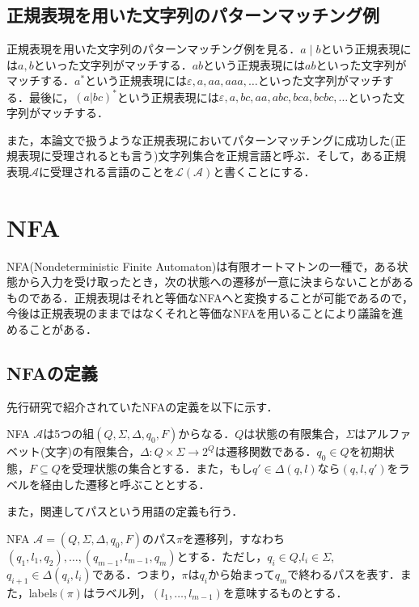 \documentclass[a4paper, 12pt, dvipdfmx, uplatex]{jsreport}
\begin{document}
\subsection{正規表現を用いた文字列のパターンマッチング例}
正規表現を用いた文字列のパターンマッチング例を見る．$a\mid b$という正規表現には$a,b$といった文字列がマッチする．$ab$という正規表現には$ab$といった文字列がマッチする．$a^*$という正規表現には$\varepsilon,a,aa,aaa,\ldots$といった文字列がマッチする．最後に，$(a|bc)^*$という正規表現には$\varepsilon,a,bc,aa,abc,bca,bcbc,\ldots$といった文字列がマッチする．

また，本論文で扱うような正規表現においてパターンマッチングに成功した(正規表現に受理されるとも言う)文字列集合を正規言語と呼ぶ．そして，ある正規表現$\mathcal{A}$に受理される言語のことを$\mathcal{L(A)}$と書くことにする．


\section{NFA}
NFA(Nondeterministic Finite Automaton)は有限オートマトンの一種で，ある状態から入力を受け取ったとき，次の状態への遷移が一意に決まらないことがあるものである．正規表現はそれと等価なNFAへと変換することが可能であるので，今後は正規表現のままではなくそれと等価なNFAを用いることにより議論を進めることがある．

\subsection{NFAの定義}
先行研究で紹介されていたNFAの定義を以下に示す．
\begin{dfn}
  NFA $\mathcal{A}$は5つの組$(Q,\Sigma,\Delta,q_0,F)$からなる．$Q$は状態の有限集合，$\Sigma$はアルファベット(文字)の有限集合，$\Delta :Q\times \Sigma \rightarrow 2^Q$は遷移関数である．$q_0 \in Q$を初期状態，$F \subseteq Q$を受理状態の集合とする．また，もし$q'\in \Delta (q,l)$なら$(q,l,q')$をラベルを経由した遷移と呼ぶこととする．
\end{dfn}

また，関連してパスという用語の定義も行う．

\begin{dfn}
  NFA $\mathcal{A}=(Q,\Sigma,\Delta,q_0,F)$のパス$\pi$を遷移列，すなわち$(q_1,l_1,q_2),\ldots,(q_{m-1},l_{m-1},q_{m})$とする．ただし，$q_i \in Q$,$l_i \in \Sigma$,$q_{i+1} \in \Delta(q_i,l_i)$である．つまり，$\pi$は$q_i$から始まって$q_m$で終わるパスを表す．また，labels$(\pi)$はラベル列，$(l_1,\ldots ,l_{m-1})$を意味するものとする．
\end{dfn}
\end{document}
